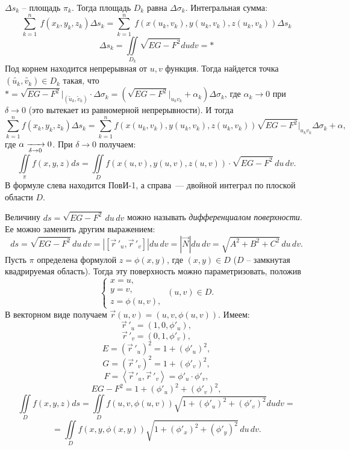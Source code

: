 \documentclass[../../main.tex]{subfiles}
\begin{document}
	$\Delta s_k$ \--- площадь $\pi_k$. Тогда площадь $D_k$ равна $\Delta\sigma
	_k$. Интегральная сумма:
	\[\sum^{n}_{k=1} \ f(x_k, y_k, z_k)\Delta s_k = \sum^{n}_{k=1} \ f(x(u_k, 
	v_k),
	 y(u_k, v_k), z(u_k, v_k))\Delta s_k \]
	\[\Delta s_k = \iint \limits_{D_k}\sqrt{EG - F^2}dudv = *  \]
	Под корнем находится непрерывная от $u, v$ функция. Тогда найдется точка $(\widetilde{u_k},
	 \widetilde{v_k}) \in D_k$ такая, что $* = \sqrt{EG -F^2} \big|_{(\widetilde{u}_k,
	  \widetilde{v}_k)} \cdot \Delta \sigma_k = (\sqrt{EG - F^2} \big|_{u_kv_k} 
	  +\alpha_k)
   \Delta \sigma_k$, где $\alpha_k \to 0$ при $\delta \to 0$ (это вытекает из 
   равномерной
    непрерывности). И тогда 
	\[ \sum_{k=1}^{n} f(x_k,y_k, z_k) \Delta s_k = \sum_{k=1}^{n} f(x(u_k, v_k),
	 y(u_k, v_k), z(u_k, v_k)) \sqrt{EG - F^2}\big|_{u_k v_k} \Delta \sigma_k
	  +\alpha,\]
	где $\alpha \xrightarrow[\delta \to 0]{} 0$. При $\delta \to 0$ получаем:
	\begin{equation}
	\label{lec23-1}
	\boxed{
	\iint \limits_{\pi} f(x,y,z)ds = \iint \limits_Df(x(u,v), y(u,v),z(u,v)) 
	\cdot \sqrt{EG - F^2}\, du\, dv.
	}
	\end{equation}
    В формуле слева находится ПовИ-1, а справа~--- двойной интеграл по плоской 
    области
     $D$.
    \begin{rem}
    Величину $ds = \sqrt{EG - F^2}\, du\, dv$ можно называть
     \emph{дифференциалом поверхности}. Ее можно заменить другим выражением:
    \[ds = \sqrt{EG - F^2}\,du\,dv = |[\vec r\,'_u, \vec r\,'_v]| 
    du\, dv =
     |\vec{N}| du\, dv = \sqrt{A^2 + B^2 + C^2}\, du\, dv. \]
    Пусть $\pi$ определена формулой $z= \phi(x,y)$, где $(x,y) \in D$ ($D$ \---
     замкнутая квадрируемая область). Тогда эту поверхность можно 
     параметризовать, положив
      \[\begin{cases} x=u, \\ y = v, \\ z= \phi(u,v),
        \end{cases}
        \ (u, v) \in D.\] В векторном виде получаем
      $\vec{r}(u,v) =
       (u, v, \phi(u,v))$. Имеем:
    \[\vec r\,'_u = (1, 0, \phi'_u),\] 
    \[\vec r\,'_v = (0, 1, \phi'_v),\]
	\[E =(\vec r\,'_u)^2 = 1 + (\phi'_u)^2,\]
	\[G =(\vec r\,'_v)^2 = 1 + (\phi'_v)^2,\]
	\[F = \left<\vec r\,'_u, \vec r\,'_v\right> = \phi'_u \cdot 
	\phi'_v,\]
	\[EG - F^2 = 1 + (\phi'_u)^2 + (\phi'_v)^2, \]
	\[\iint \limits_D f(x, y, z)ds = \iint \limits_D f(u,v, \phi(u,v)) \sqrt{1 +
		 (\phi'_u)^2 + (\phi'_v)^2} dudv = \] \[= \iint \limits_D f(x,y, \phi(x,y))
	  \sqrt{1 + (\phi'_x)^2 + (\phi'_y)^2}\, du\,dv. \]
	\end{rem}
\end{document}
